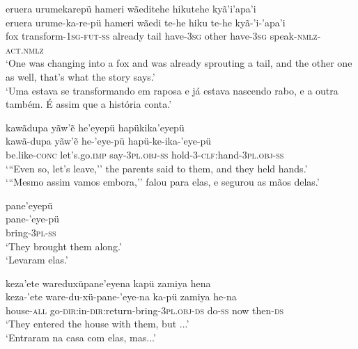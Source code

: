 \documentclass[output=paper,
modfonts,nonflat
]{langsci/langscibook}
\begin{document}
\ea   eruera urumekarepü hameri wãeditehe hikutehe kyã'i'apa'i \\[.3em]
\gll  eruera urume-ka-re-pü hameri wãedi te-he hiku te-he kyã-'i-'apa'i\\
fox transform-\textsc{1sg-fut-ss} already tail have-\textsc{3sg} other have-\textsc{3sg} speak-\textsc{nmlz-act.nmlz}\\
\glt   `One was changing into a fox and was already sprouting a tail, and the other one as well, that's what the story says.' \\
`Uma estava se transformando em raposa e já estava nascendo rabo, e a outra também. É assim que a história conta.'\\
\z

\ea   kawãdupa yãw'ẽ he'eyepü hapükika'eyepü \\[.3em]
\gll 	kawã-dupa yãw'ẽ he-'eye-pü hapü-ke-ika-'eye-pü\\
be.like-\textsc{conc} let's.go.\textsc{imp} say-\textsc{3pl.obj-ss} hold-\textsc{3-clf:}hand-\textsc{3pl.obj-ss}\\
\glt    `{``}Even so, let's leave,'' the parents said to them, and they held hands.'  \\
 `{``}Mesmo assim vamos embora,'' falou para elas, e segurou as mãos delas.'  \\
%
\z

\ea   pane'eyepü \\[.3em]
\gll 	pane-'eye-pü\\
bring-\textsc{3pl-ss}\\
\glt   `They brought them along.' \\
`Levaram elas.'\\
\z

\ea   keza'ete wareduxüpane'eyena kapü zamiya hena \\[.3em]
\gll 	keza-'ete ware-du-xü-pane-'eye-na ka-pü zamiya he-na\\		house-\textsc{all} go-\textsc{dir:}in-\textsc{dir:}return-bring-\textsc{3pl.obj-ds} do-\textsc{ss} now then-\textsc{ds} \\
\glt   `They entered the house with them, but ...' \\
`Entraram na casa com elas, mas...'
\z 
 
\end{document}
